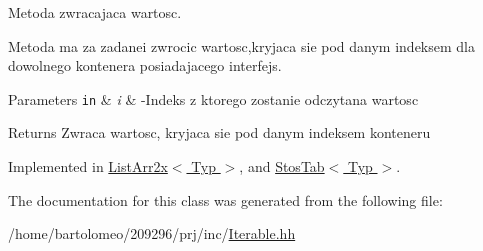 Metoda zwracajaca wartosc. 

Metoda ma za zadanei zwrocic wartosc,kryjaca sie pod danym indeksem dla dowolnego kontenera posiadajacego interfejs.


\begin{DoxyParams}[1]{Parameters}
\mbox{\tt in}  & {\em i} & -\/\-Indeks z ktorego zostanie odczytana wartosc\\
\hline
\end{DoxyParams}
\begin{DoxyReturn}{Returns}
Zwraca wartosc, kryjaca sie pod danym indeksem konteneru 
\end{DoxyReturn}


Implemented in \hyperlink{class_list_arr2x_a1d441a5e86d979c8093543218faa13b3}{List\-Arr2x$<$ Typ $>$}, and \hyperlink{class_stos_tab_aeae02936cdfdb3df20084174817b85dd}{Stos\-Tab$<$ Typ $>$}.



The documentation for this class was generated from the following file\-:\begin{DoxyCompactItemize}
\item 
/home/bartolomeo/209296/prj/inc/\hyperlink{_iterable_8hh}{Iterable.\-hh}\end{DoxyCompactItemize}

